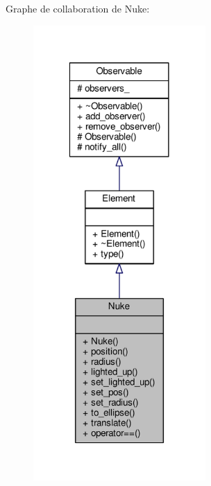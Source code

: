 Graphe de collaboration de Nuke\+:
\nopagebreak
\begin{figure}[H]
\begin{center}
\leavevmode
\includegraphics[width=186pt]{dc/d8c/classNuke__coll__graph}
\end{center}
\end{figure}
